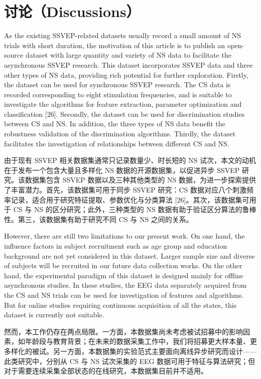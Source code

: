 \documentclass[11pt]{ctexart}
\newenvironment{en}{\begin{enbox}\color{black!85}}{\end{enbox}}
\newenvironment{zh}{\begin{zhbox}}{\end{zhbox}}
\begin{document}
\section{讨论（Discussions）}
\begin{en}
As the existing SSVEP-related datasets usually record a small amount of NS trials with short duration, the motivation of this article is to publish an open-source dataset with large quantity and variety of NS data to facilitate the asynchronous SSVEP research. This dataset incorporates SSVEP data and three other types of NS data, providing rich potential for further exploration. Firstly, the dataset can be used for synchronous SSVEP research. The CS data is recorded corresponding to eight stimulation frequencies, and is suitable to investigate the algorithms for feature extraction, parameter optimization and classification [26]. Secondly, the dataset can be used for discrimination studies between CS and NS. In addition, the three types of NS data benefit the robustness validation of the discrimination algorithms. Thirdly, the dataset facilitates the investigation of relationships between different CS and NS.
\end{en}
\begin{zh}
由于现有 SSVEP 相关数据集通常只记录数量少、时长短的 NS 试次，本文的动机在于发布一个包含大量且多样化 NS 数据的开源数据集，以促进异步 SSVEP 研究。该数据集包含 SSVEP 数据以及三种其他类型的 NS 数据，为进一步探索提供了丰富潜力。首先，该数据集可用于同步 SSVEP 研究：CS 数据对应八个刺激频率记录，适合用于研究特征提取、参数优化与分类算法 [26]。其次，该数据集可用于 CS 与 NS 的区分研究；此外，三种类型的 NS 数据有助于验证区分算法的鲁棒性。第三，该数据集有助于研究不同 CS 与 NS 之间的关系。
\end{zh}

\begin{en}
However, there are still two limitations to our present work. On one hand, the influence factors in subject recruitment such as age group and education background are not yet considered in this dataset. Larger sample size and diverse of subjects will be recruited in our future data collection works. On the other hand, the experimental paradigm of this dataset is designed mainly for offline asynchronous studies. In these studies, the EEG data separately acquired from the CS and NS trials can be used for investigation of features and algorithms. But for online studies requiring continuous acquisition of all the states, this dataset is currently not suitable.
\end{en}
\begin{zh}
然而，本工作仍存在两点局限。一方面，本数据集尚未考虑被试招募中的影响因素，如年龄段与教育背景；在未来的数据采集工作中，我们将招募更大样本量、更多样化的被试。另一方面，本数据集的实验范式主要面向离线异步研究而设计——此类研究中，分别从 CS 与 NS 试次采集的 EEG 数据可用于特征与算法研究；但对于需要连续采集全部状态的在线研究，本数据集目前并不适用。
\end{zh}
\end{document}
